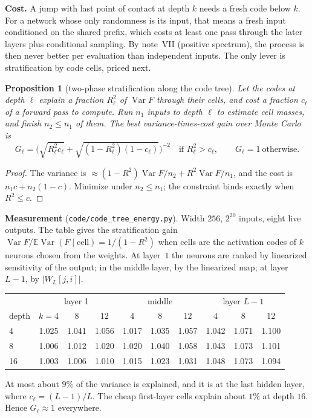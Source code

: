 \documentclass[11pt]{article}
\newtheorem{proposition}[theorem]{Proposition}
\theoremstyle{definition}
\theoremstyle{remark}
\newcommand{\E}{\mathbb E}
\newcommand{\Var}{\operatorname{Var}}
\begin{document}
\textbf{Cost.} A jump with last point of contact at depth $k$ needs a fresh code below $k$. For a network whose only randomness is its input, that means a fresh input conditioned on the shared prefix, which costs at least one pass through the later layers plus conditional sampling. By note~VII (positive spectrum), the process is then never better per evaluation than independent inputs. The only lever is stratification by code cells, priced next.

\begin{proposition}[two-phase stratification along the code tree]\label{prop:twophase}
Let the codes at depth $\ell$ explain a fraction $R^2_\ell$ of $\Var F$ through their cells, and cost a fraction $c_\ell$ of a forward pass to compute. Run $n_1$ inputs to depth $\ell$ to estimate cell masses, and finish $n_2\le n_1$ of them. The best variance-times-cost gain over Monte Carlo is
\[G_\ell=\Big(\sqrt{R^2_\ell c_\ell}+\sqrt{(1-R^2_\ell)(1-c_\ell)}\Big)^{-2}\quad\text{if }R^2_\ell>c_\ell,\qquad G_\ell=1\ \text{otherwise}.\]
\end{proposition}

\begin{proof}
The variance is $\approx(1-R^2)\Var F/n_2+R^2\Var F/n_1$, and the cost is $n_1c+n_2(1-c)$. Minimize under $n_2\le n_1$; the constraint binds exactly when $R^2\le c$.
\end{proof}

\textbf{Measurement} (\texttt{code/code\_tree\_energy.py}). Width $256$, $2^{20}$ inputs, eight live outputs. The table gives the stratification gain $\Var F/\E\Var(F\mid\text{cell})=1/(1-R^2)$ when cells are the activation codes of $k$ neurons chosen from the weights. At layer~$1$ the neurons are ranked by linearized sensitivity of the output; in the middle layer, by the linearized map; at layer $L-1$, by $|W_L[j,i]|$.
\begin{center}\small\setlength{\tabcolsep}{4pt}
\begin{tabular}{lccccccccc}
\toprule
& \multicolumn{3}{c}{layer 1} & \multicolumn{3}{c}{middle} & \multicolumn{3}{c}{layer $L-1$}\\
depth & $k{=}4$ & $8$ & $12$ & $4$ & $8$ & $12$ & $4$ & $8$ & $12$\\
\midrule
4 & 1.025 & 1.041 & 1.056 & 1.017 & 1.035 & 1.057 & 1.042 & 1.071 & 1.100\\
8 & 1.006 & 1.012 & 1.020 & 1.020 & 1.040 & 1.058 & 1.043 & 1.073 & 1.101\\
16 & 1.003 & 1.006 & 1.010 & 1.015 & 1.023 & 1.031 & 1.048 & 1.073 & 1.094\\
\bottomrule
\end{tabular}
\end{center}
At most about $9\%$ of the variance is explained, and it is at the last hidden layer, where $c_\ell=(L-1)/L$. The cheap first-layer cells explain about $1\%$ at depth $16$. Hence $G_\ell\approx1$ everywhere.
\end{document}
